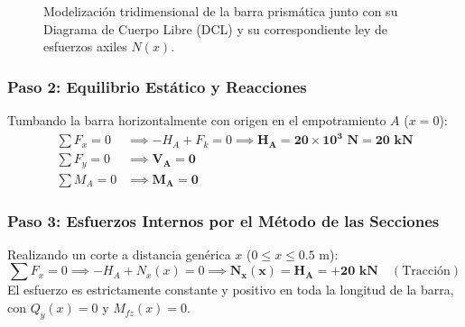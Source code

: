 \begin{figure}[H]
{%
    }
    \caption{Modelización tridimensional de la barra prismática junto con su Diagrama de Cuerpo Libre (DCL) y su correspondiente ley de esfuerzos axiles $N(x)$.}
    \label{fig:pilar_poisson_dcl}
\end{figure}

\subsubsection*{Paso 2: Equilibrio Estático y Reacciones}
Tumbando la barra horizontalmente con origen en el empotramiento $A$ ($x = 0$):
\begin{align}
    \sum F_x = 0 & \implies -H_A + F_k = 0 \implies \mathbf{H_A = 20 \times 10^3\text{ N} = 20\text{ kN}} \\
    \sum F_y = 0 & \implies \mathbf{V_A = 0}                                                              \\
    \sum M_A = 0 & \implies \mathbf{M_A = 0}
\end{align}

\subsubsection*{Paso 3: Esfuerzos Internos por el Método de las Secciones}
Realizando un corte a distancia genérica $x$ ($0 \le x \le 0.5\text{ m}$):
\begin{equation}
    \sum F_x = 0 \implies -H_A + N_x(x) = 0 \implies \mathbf{N_x(x) = H_A = +20\text{ kN}} \quad (\text{Tracción})
\end{equation}
El esfuerzo es estrictamente constante y positivo en toda la longitud de la barra, con $Q_y(x) = 0$ y $M_{fz}(x) = 0$.

